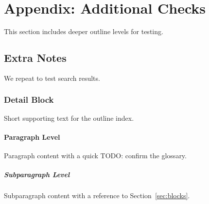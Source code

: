 \section{Appendix: Additional Checks}\label{sec:appendix}
This section includes deeper outline levels for testing.

\subsection{Extra Notes}\label{sec:appendix-notes}
We repeat  to test search results.

\subsubsection{Detail Block}
Short supporting text for the outline index.

\paragraph{Paragraph Level}
Paragraph content with a quick TODO: confirm the glossary.

\subparagraph{Subparagraph Level}
Subparagraph content with a reference to Section~\ref{sec:blocks}.
